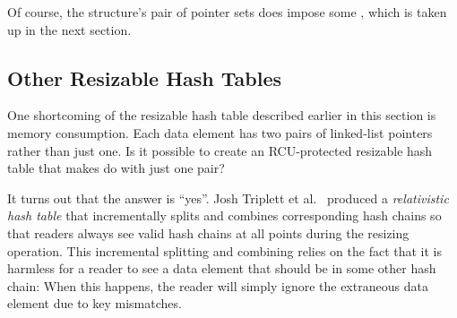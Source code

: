 Of course, the  structure's
pair of pointer sets does impose some ,
which is taken up in the next section.

\subsection{Other Resizable Hash Tables}
\label{sec:datastruct:Other Resizable Hash Tables}

One shortcoming of the resizable hash table described earlier in this
section is memory consumption.
Each data element has two pairs of linked-list pointers rather than just
one.
Is it possible to create an RCU-protected resizable hash table that
makes do with just one pair?

It turns out that the answer is ``yes''.
Josh Triplett et al.~\cite{Triplett:2011:RPHash}
produced a \emph{relativistic hash table} that incrementally
splits and combines corresponding hash chains so that readers always
see valid hash chains at all points during the resizing operation.
This incremental splitting and combining relies on the fact that it
is harmless for a reader to see a data element that should be in some
other hash chain: When this happens, the reader will simply ignore the
extraneous data element due to key mismatches.

